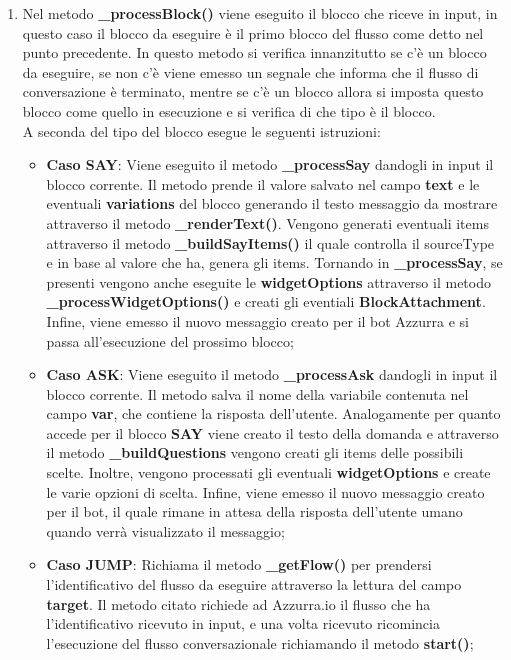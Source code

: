 \begin{enumerate}
	\item Nel metodo \textbf{\_processBlock()} viene eseguito il blocco che riceve in input, in questo caso il blocco da eseguire è il primo blocco del flusso come detto nel punto precedente. In questo metodo si verifica innanzitutto se c'è un blocco da eseguire, se non c'è viene emesso un segnale che informa che il flusso di conversazione è terminato, mentre se c'è un blocco allora si imposta questo blocco come quello in esecuzione e si verifica di che tipo è il blocco.\\
	A seconda del tipo del blocco esegue le seguenti istruzioni:
	\begin{itemize}
		\item \textbf{Caso SAY}: Viene eseguito il metodo \textbf{\_processSay} dandogli in input il blocco corrente. Il metodo prende il valore salvato nel campo \textbf{text} e le eventuali \textbf{variations} del blocco generando il testo messaggio da mostrare attraverso il metodo \textbf{\_renderText()}. Vengono generati eventuali items attraverso il metodo \textbf{\_buildSayItems()} il quale controlla il sourceType e in base al valore che ha, genera gli items. Tornando in \textbf{\_processSay}, se presenti vengono anche eseguite le \textbf{widgetOptions} attraverso il metodo \textbf{\_processWidgetOptions()} e creati gli eventiali \textbf{BlockAttachment}. Infine, viene emesso il nuovo messaggio creato per il bot Azzurra e si passa all'esecuzione del prossimo blocco;
		\item \textbf{Caso ASK}: Viene eseguito il metodo \textbf{\_processAsk} dandogli in input il blocco corrente. Il metodo salva il nome della variabile contenuta nel campo \textbf{var}, che contiene la risposta dell'utente. Analogamente per quanto accede per il blocco \textbf{SAY} viene creato il testo della domanda e attraverso il metodo \textbf{\_buildQuestions} vengono creati gli items delle possibili scelte. Inoltre, vengono processati gli eventuali \textbf{widgetOptions} e create le varie opzioni di scelta. Infine, viene emesso il nuovo messaggio creato per il bot, il quale rimane in attesa della risposta dell'utente umano quando verrà visualizzato il messaggio;
		\item \textbf{Caso JUMP}: Richiama il metodo \textbf{\_getFlow()} per prendersi l'identificativo del flusso da eseguire attraverso la lettura del campo \textbf{target}. Il metodo citato richiede ad Azzurra.io il flusso che ha l'identificativo ricevuto in input, e una volta ricevuto ricomincia l'esecuzione del flusso conversazionale richiamando il metodo \textbf{start()};

\end{itemize}
\end{enumerate}
